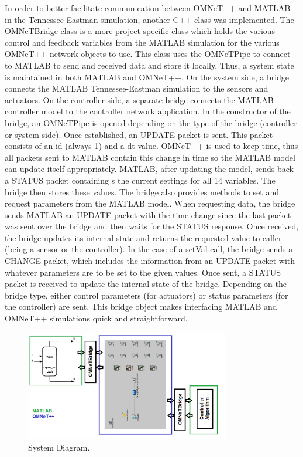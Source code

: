 In order to better facilitate communication between OMNeT++ and MATLAB in the Tennessee-Eastman simulation, another C++ class was implemented. The OMNeTBridge class is a more project-specific class which holds the various control and feedback variables from the MATLAB simulation for the various OMNeT++ network objects to use. This class uses the OMNeTPipe to connect to MATLAB to send and received data and store it locally. Thus, a system state is maintained in both MATLAB and OMNeT++. On the system side, a bridge connects the MATLAB Tennessee-Eastman simulation to the sensors and actuators. On the controller side, a separate bridge connects the MATLAB controller model to the controller network application. In the constructor of the bridge, an OMNeTPipe is opened depending on the type of the bridge (controller or system side). Once established, an UPDATE packet is sent. This packet consists of an id (always 1) and a dt value. OMNeT++ is used to keep time, thus all packets sent to MATLAB contain this change in time so the MATLAB model can update itself appropriately. MATLAB, after updating the model, sends back a STATUS packet containing s the current settings for all 14 variables. The bridge then stores these values. The bridge also provides methods to set and request parameters from the MATLAB model. When requesting data, the bridge sends MATLAB an UPDATE packet with the time change since the last packet was sent over the bridge and then waits for the STATUS response. Once received, the bridge updates its internal state and returns the requested value to caller (being a sensor or the controller). In the case of a setVal call, the bridge sends a CHANGE packet, which includes the information from an UPDATE packet with whatever parameters are to be set to the given values. Once sent, a STATUS packet is received to update the internal state of the bridge. Depending on the bridge type, either control parameters (for actuators) or status parameters (for the controller) are sent. This bridge object makes interfacing MATLAB and OMNeT++ simulations quick and straightforward.


\begin{figure}
        \centering
		\includegraphics[width=0.8\textwidth]{figs/system.png}
        \caption{System Diagram.}
        \label{fig:system}        
\end{figure}

